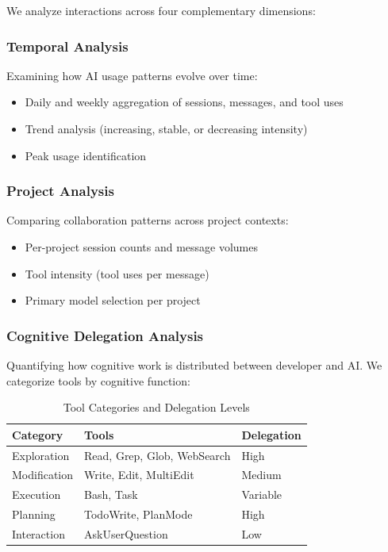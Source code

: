 \documentclass{ntlabs-preprint}
\begin{document}
We analyze interactions across four complementary dimensions:

\subsubsection{Temporal Analysis}

Examining how AI usage patterns evolve over time:
\begin{itemize}
    \item Daily and weekly aggregation of sessions, messages, and tool uses
    \item Trend analysis (increasing, stable, or decreasing intensity)
    \item Peak usage identification
\end{itemize}

\subsubsection{Project Analysis}

Comparing collaboration patterns across project contexts:
\begin{itemize}
    \item Per-project session counts and message volumes
    \item Tool intensity (tool uses per message)
    \item Primary model selection per project
\end{itemize}

\subsubsection{Cognitive Delegation Analysis}

Quantifying how cognitive work is distributed between developer and AI. We categorize tools by cognitive function:

\begin{table}[h]
\centering
\caption{Tool Categories and Delegation Levels}
\label{tab:tools}
\begin{tabular}{lll}
\toprule
\textbf{Category} & \textbf{Tools} & \textbf{Delegation} \\
\midrule
Exploration & Read, Grep, Glob, WebSearch & High \\
Modification & Write, Edit, MultiEdit & Medium \\
Execution & Bash, Task & Variable \\
Planning & TodoWrite, PlanMode & High \\
Interaction & AskUserQuestion & Low \\
\bottomrule
\end{tabular}
\end{table}
\end{document}

